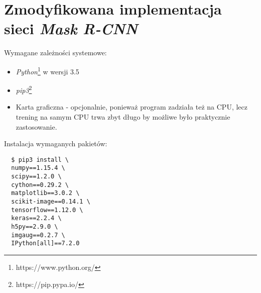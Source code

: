 \section*{Zmodyfikowana implementacja sieci \textit{Mask R-CNN}}

Wymagane zależności systemowe:

\begin{itemize}
  \item \textit{Python}\footnote{https://www.python.org/} w wersji 3.5
  \item \textit{pip3}\footnote{https://pip.pypa.io/}
  \item Karta graficzna - opcjonalnie, ponieważ program zadziała też na CPU, lecz trening na samym CPU trwa zbyt długo by możliwe było praktycznie zastosowanie.
\end{itemize}

Instalacja wymaganych pakietów:

\begin{verbatim}
  $ pip3 install \
  numpy==1.15.4 \
  scipy==1.2.0 \
  cython==0.29.2 \
  matplotlib==3.0.2 \
  scikit-image==0.14.1 \
  tensorflow==1.12.0 \
  keras==2.2.4 \
  h5py==2.9.0 \
  imgaug==0.2.7 \
  IPython[all]==7.2.0
\end{verbatim}